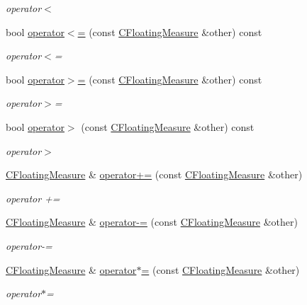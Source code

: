 \begin{DoxyCompactItemize}
\begin{DoxyCompactList}\small\item\em operator$<$ \end{DoxyCompactList}\item 
bool \hyperlink{classCFloatingMeasure_ad8b94201f5df969de576f89a249c947e}{operator$<$=} (const \hyperlink{classCFloatingMeasure}{C\+Floating\+Measure} \&other) const
\begin{DoxyCompactList}\small\item\em operator$<$= \end{DoxyCompactList}\item 
bool \hyperlink{classCFloatingMeasure_aa6575f6f658ee524da9e5f123189cef1}{operator$>$=} (const \hyperlink{classCFloatingMeasure}{C\+Floating\+Measure} \&other) const
\begin{DoxyCompactList}\small\item\em operator$>$= \end{DoxyCompactList}\item 
bool \hyperlink{classCFloatingMeasure_a59cd04759c33941c7c20db3c81dcde14}{operator$>$} (const \hyperlink{classCFloatingMeasure}{C\+Floating\+Measure} \&other) const
\begin{DoxyCompactList}\small\item\em operator$>$ \end{DoxyCompactList}\item 
\hyperlink{classCFloatingMeasure}{C\+Floating\+Measure} \& \hyperlink{classCFloatingMeasure_a40f0ec4cb155856efed8db28c7c8fa3e}{operator+=} (const \hyperlink{classCFloatingMeasure}{C\+Floating\+Measure} \&other)
\begin{DoxyCompactList}\small\item\em operator += \end{DoxyCompactList}\item 
\hyperlink{classCFloatingMeasure}{C\+Floating\+Measure} \& \hyperlink{classCFloatingMeasure_a3661f71ed47a6659f7e27adff3c5c369}{operator-\/=} (const \hyperlink{classCFloatingMeasure}{C\+Floating\+Measure} \&other)
\begin{DoxyCompactList}\small\item\em operator-\/= \end{DoxyCompactList}\item 
\hyperlink{classCFloatingMeasure}{C\+Floating\+Measure} \& \hyperlink{classCFloatingMeasure_a2df7738d5c017a02c1f11c40809cac96}{operator$\ast$=} (const \hyperlink{classCFloatingMeasure}{C\+Floating\+Measure} \&other)
\begin{DoxyCompactList}\small\item\em operator$\ast$= \end{DoxyCompactList}\item 

\end{DoxyCompactItemize}
